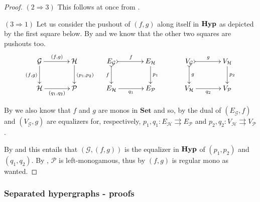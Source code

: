 \documentclass[3p]{elsarticle}
\newcommand{\Set}{\mathbf{Set}}
\newcommand{\catname}[1]{\textbf{\textup{#1}}}
\newcommand{\hyp}{\catname{Hyp}}
\theoremstyle{remark}
\theoremstyle{definition}
\begin{document}
\begin{proof}
	\smallskip \noindent
	$(2\Rightarrow 3)$ This follows at once from .
	
	\smallskip \noindent
	$(3\Rightarrow 1)$ Let us consider the pushout of $(f,g)$ along itself in $\hyp$ as depicted by the first square below. By  and  we know that the other two squares are pushouts too.
	\[\xymatrix@C=35pt{\mathcal{G} \ar[r]^{(f,g)}  \ar[d]_{(f,g)}& \mathcal{H}\ar[d]^{(p_1, p_2)} & E_{\mathcal{G}} \ar@{>->}[d]_{f}\ar@{>->}[r]^{f} & E_{\mathcal{H}} \ar[d]^{p_1}& V_{\mathcal{G}}\ar@{>->}[r]^{g} \ar@{>->}[d]^{g} & V_{\mathcal{H}} \ar[d]^{p_2}\\\mathcal{H} \ar[r]_{(q_1, q_2)} & \mathcal{P} & E_{\mathcal{H}} \ar[r]_{q_1}& E_{\mathcal{P}} & V_{\mathcal{H}}\ar[r]_{q_2} & V_{\mathcal{P}}}\]
	
	 By  we also know that $f$ and $g$ are monos in $\Set$ and so, by the dual of  $(E_\mathcal{G}, f)$ and $(V_{\mathcal{G}}, g)$ are equalizers for, respectively, $p_1, q_1\colon E_{\mathcal{H}}\rightrightarrows E_{\mathcal{P}}$ and $p_2, q_2\colon V_{\mathcal{H}}\rightrightarrows V_{\mathcal{P}}$.
	
	By  and  this entails that $(\mathcal{G}, (f,g))$ is the equalizer in $\hyp$ of $(p_1, p_2)$ and $(q_1, q_2)$. By , $\mathcal{P}$ is left-monogamous, thus by  $(f,g)$ is regular mono as wanted.
\end{proof} 

\subsubsection{Separated hypergraphs - proofs}
\end{document}
